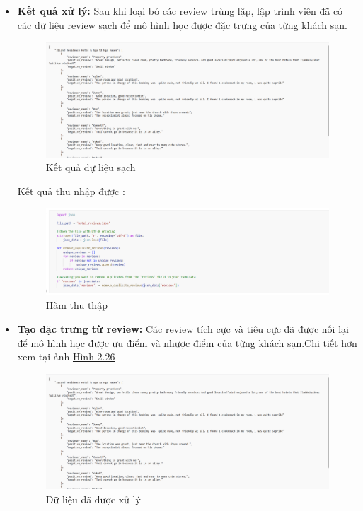 \begin{itemize}
    \item \textbf{Kết quả xử lý:} Sau khi loại bỏ các review trùng lặp, lập trình viên đã có các dữ liệu review sạch để mô hình học được đặc trưng của từng khách sạn. 
    \begin{figure}[H] %
        \centering
        \includegraphics[width=1.0\linewidth]{Figures/2.19.png}
        \caption{Kết quả dự liệu sạch}
        \label{fig:iot}
    \end{figure}
    Kết quả thu nhập được :
    \begin{figure}[H] %
        \centering
        \includegraphics[width=1.0\linewidth]{Figures/2.20.png}
        \caption{Hàm thu thập}
        \label{fig:iot}
    \end{figure}
    \item \textbf{Tạo đặc trưng từ review:} Các review tích cực và tiêu cực đã được nối lại để mô hình học được ưu điểm và nhược điểm của từng khách sạn.Chi tiết hơn xem tại ảnh \hyperref[fig:image2.26]{Hình 2.26}
    \begin{figure}[H] %
        \centering
        \includegraphics[width=1.0\linewidth]{Figures/2.21.png}
        \caption{Dữ liệu đã được xử lý}
        \label{fig:image2.26}
    \end{figure}
\end{itemize}

